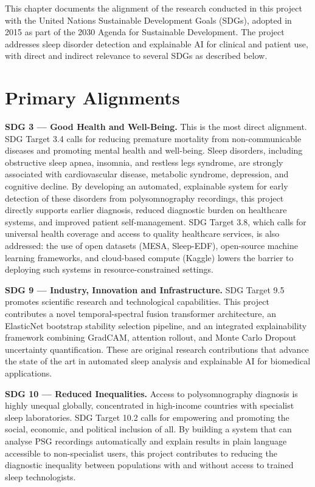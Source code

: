 
This chapter documents the alignment of the research conducted in this project with the United Nations Sustainable Development Goals (SDGs), adopted in 2015 as part of the 2030 Agenda for Sustainable Development. The project addresses sleep disorder detection and explainable AI for clinical and patient use, with direct and indirect relevance to several SDGs as described below.

\section*{Primary Alignments}

\textbf{SDG 3 — Good Health and Well-Being.}
This is the most direct alignment. SDG Target 3.4 calls for reducing premature mortality from non-communicable diseases and promoting mental health and well-being. Sleep disorders, including obstructive sleep apnea, insomnia, and restless legs syndrome, are strongly associated with cardiovascular disease, metabolic syndrome, depression, and cognitive decline. By developing an automated, explainable system for early detection of these disorders from polysomnography recordings, this project directly supports earlier diagnosis, reduced diagnostic burden on healthcare systems, and improved patient self-management. SDG Target 3.8, which calls for universal health coverage and access to quality healthcare services, is also addressed: the use of open datasets (MESA, Sleep-EDF), open-source machine learning frameworks, and cloud-based compute (Kaggle) lowers the barrier to deploying such systems in resource-constrained settings.

\textbf{SDG 9 — Industry, Innovation and Infrastructure.}
SDG Target 9.5 promotes scientific research and technological capabilities. This project contributes a novel temporal-spectral fusion transformer architecture, an ElasticNet bootstrap stability selection pipeline, and an integrated explainability framework combining GradCAM, attention rollout, and Monte Carlo Dropout uncertainty quantification. These are original research contributions that advance the state of the art in automated sleep analysis and explainable AI for biomedical applications.

\textbf{SDG 10 — Reduced Inequalities.}
Access to polysomnography diagnosis is highly unequal globally, concentrated in high-income countries with specialist sleep laboratories. SDG Target 10.2 calls for empowering and promoting the social, economic, and political inclusion of all. By building a system that can analyse PSG recordings automatically and explain results in plain language accessible to non-specialist users, this project contributes to reducing the diagnostic inequality between populations with and without access to trained sleep technologists.

